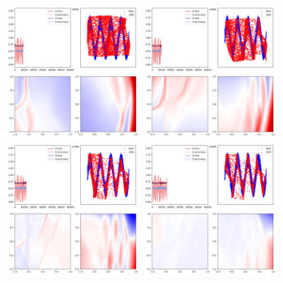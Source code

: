 \documentclass[lang=cn,11pt]{elegantpaper}
\begin{document}
\begin{figure}[hbt]
\centering
  \includegraphics[width=0.45\textwidth]{sin_3_1}
  \includegraphics[width=0.45\textwidth]{sin_3_2}\\
  \includegraphics[width=0.45\textwidth]{sin_3_3}
  \includegraphics[width=0.45\textwidth]{sin_3_4}
  \caption{}
\end{figure}
\end{document}
